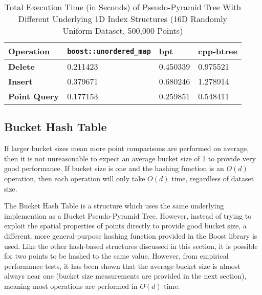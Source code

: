 \begin{table}
	\centering
	\begin{tabular}{|l|l|l|l|}
		\hline
		\textbf{Operation} & \texttt{boost::unordered\_map} & bpt & cpp-btree  \\
		\hline
		\textbf{Delete} & 0.211423 & 0.450339 & 0.975521 \\
		\textbf{Insert} & 0.379671 & 0.680246 & 1.278914 \\
		\textbf{Point Query} & 0.177153 & 0.259851 & 0.548411 \\
		\hline
	\end{tabular}
	\caption{Total Execution Time (in Seconds) of Pseudo-Pyramid Tree With Different Underlying 1D Index Structures (16D Randomly Uniform Dataset, 500,000 Points)}
	\label{tab:hashtable-bplus-time-comparison}
\end{table}

\subsection{Bucket Hash Table}


If larger bucket sizes mean more point comparisons are performed on average, then it is not unreasonable to expect an average bucket size of 1 to provide very good performance. If bucket size is one and the hashing function is an $O(d)$ operation, then each operation will only take $O(d)$ time, regardless of dataset size.

The Bucket Hash Table is a structure which uses the same underlying implemention as a Bucket Pseudo-Pyramid Tree. However, instead of trying to exploit the spatial properties of points directly to provide good bucket size, a different, more general-purpose hashing function provided in the Boost library is used. Like the other hash-based structures discussed in this section, it is possible for two points to be hashed to the same value. However, from empirical performance tests, it has been shown that the average bucket size is almost always near one (bucket size measurements are provided in the next section), meaning most operations are performed in $O(d)$ time.

